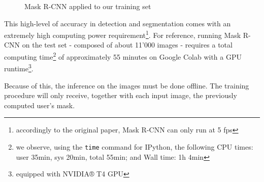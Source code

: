 \begin{figure}[!h]
\begin{center}
\begin{subfigure}[h]{0.32\textwidth}
		\end{subfigure}
	\end{center}
	\vspace{-0.5cm}
	\caption[Mask R-CNN applied to our training set]{Mask R-CNN applied to our training set}
	\label{fig:maskrcnn-dario}
\end{figure}

This high-level of accuracy in detection and segmentation comes with an extremely high computing power requirement\footnote{accordingly to the original paper, Mask R-CNN can only run at 5 \gls{fps}}. For reference, running Mask R-CNN on the test set - composed of about 11'000 images - requires a total computing time\footnote{we observe, using the \texttt{time} command for IPython, the following CPU times: user 35min, sys 20min, total 55min; and Wall time: 1h 4min} of approximately 55 minutes on Google Colab with a GPU runtime\footnote{equipped with NVIDIA® T4 GPU}.

Because of this, the inference on the images must be done offline. The training procedure will only receive, together with each input image, the previously computed user's mask.









